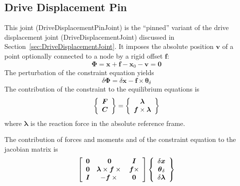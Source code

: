 \documentclass[10pt,dvips,fleqn,subeqn]{report}
\newcommand{\T}[1]{\boldsymbol{#1}}
\begin{document}
\subsection{Drive Displacement Pin}
\label{sec:DriveDisplacementPinJoint}
This joint (DriveDisplacementPinJoint) is the ``pinned'' variant 
of the drive displacement joint (DriveDisplacementJoint) discussed
in Section~\ref{sec:DriveDisplacementJoint}.
It imposes the absolute position $\T{v}$ of a point
optionally connected to a node by a rigid offset $\T{f}$:
\begin{equation}
	\T{\Phi} = \T{x} + \T{f} - \T{x}_0 - \T{v} = \T{0}
\end{equation}
The perturbation of the constraint equation yields
\begin{equation}
	\delta\T{\Phi} = 
	\delta\T{x} - \T{f}\times \T{\theta}_{\delta}
\end{equation}
The contribution of the constraint to the equilibrium equations is
\begin{equation}
	\cubr{\cvvect{
		\T{F} \\
		\T{C}
	}} = \cubr{\cvvect{
		\T{\lambda} \\
		\T{f}\times \T{\lambda}
	}}
\end{equation}
where $\T{\lambda}$ is the reaction force in the absolute reference frame.

The contribution of forces and moments and of the constraint equation 
to the jacobian matrix is
\begin{equation}
	\sqbr{\matr{ccc}{
		\T{0} &
			\T{0} &
			\T{I} \\
		\T{0} &
			\T{\lambda}\times\T{f}\times{} &
			\T{f}\times \\
		\T{I} &
			- \T{f}\times{} &
			\T{0}
	}}\cubr{\cvvect{
		\delta\T{x} \\
		\T{\theta}_{\delta} \\
		\delta\T{\lambda}
	}}
\end{equation}
\end{document}

